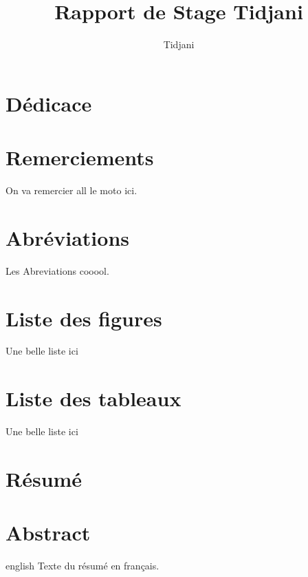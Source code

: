 \documentclass[MSc,extensionUQAC,english,french]{ulthese}
\author{Tidjani}
\title{Rapport de Stage Tidjani}
\begin{document}
\frontmatter
\chapter*{Dédicace}
{} %
	\paragraph{}



\chapter*{Remerciements}         %
 On va remercier all le moto ici.


 \tableofcontents{}
 	
\chapter*{Abréviations}
{} %
  Les Abreviations cooool.

\chapter*{Liste des figures}
{} %
  Une belle liste ici
  
\chapter*{Liste des tableaux}
{} %
  Une belle liste ici

\chapter*{Résumé}                      %
{} %
\addto{\captionsenglish}{\renewcommand*{\contentsname}{Table of contents}}

\chapter*{Abstract}
\begin{otherlanguage*}{english}
  Texte du résumé en français.
\end{otherlanguage*}
\end{document}
